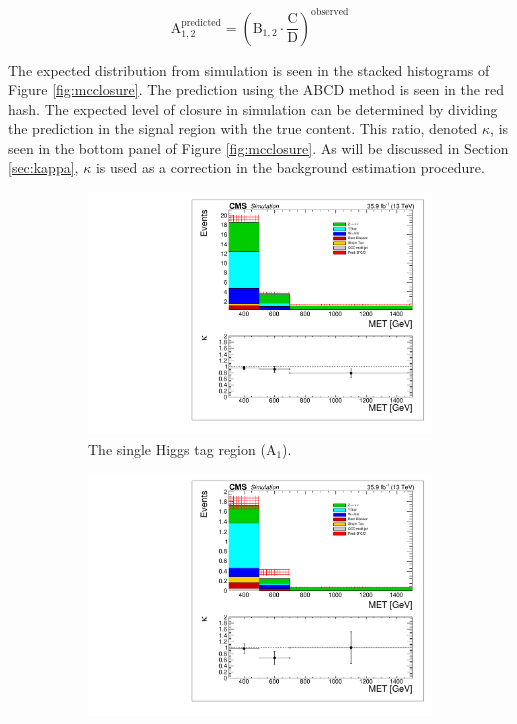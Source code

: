 \begin{equation}
\mathrm{A}_{1, 2}^{\mathrm{predicted}} = (\mathrm{B}_{1, 2} \cdot \frac{\mathrm{C}}{\mathrm{D}})^{\mathrm{observed}}
\end{equation}

The expected \ptmiss distribution from simulation is seen in the stacked histograms of Figure \ref{fig:mcclosure}. The prediction using the ABCD method is seen in the red hash. The expected level of closure in simulation can be determined by dividing the prediction in the signal region with the true content. This ratio, denoted $\kappa$, is seen in the bottom panel of Figure \ref{fig:mcclosure}. As will be discussed in Section \ref{sec:kappa}, $\kappa$ is used as a correction in the background estimation procedure.

\begin{figure}
\begin{subfigure}[b]{0.5\textwidth}
\centering
\includegraphics[trim={5px 5px 5px 5px},clip,width=\textwidth]{figs/SUS17006/MCclosure_singleHiggsRegionTotal.pdf}
\caption{The single Higgs tag region (A$_{1}$).}
\end{subfigure}
\begin{subfigure}[b]{0.5\textwidth}
\centering
\includegraphics[trim={5px 5px 5px 5px},clip,width=\textwidth]{figs/SUS17006/MCclosure_doubleHiggsRegionTotal.pdf} 

\end{subfigure}
\end{figure}
